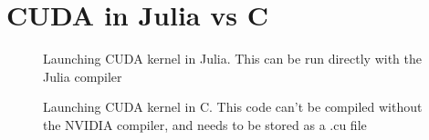 \chapter{CUDA in Julia vs C}
\label{app:jlscicomp}

\begin{figure}[h]
    \centering
    
    \caption{Launching CUDA kernel in Julia. This can be run directly with the Julia compiler}
    \label{fig:jlcuda}
\end{figure}
 
\begin{figure}[h]
    \centering
    
    \caption{Launching CUDA kernel in C. This code can't be compiled without the NVIDIA compiler, and needs to be stored as a .cu file}
    \label{fig:ccuda}
\end{figure}
